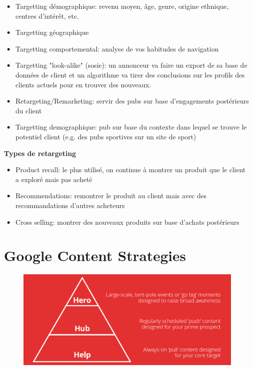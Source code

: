 \begin{itemize}
    \item Targetting démographique: revenu moyen, âge, genre, origine ethnique, centres d'intérêt, etc.
    \item Targetting géographique
    \item Targetting comportemental: analyse de vos habitudes de navigation
    \item Targetting "look-alike" (sosie): un annonceur va faire un export de sa base de données de client et un algorithme va tirer des conclusions sur les profils des clients actuels pour en trouver des nouveaux.
    \item Retargeting/Remarketing: servir des pubs sur base d'engagements postérieurs du client
    \item Targetting demographique: pub sur base du contexte dans lequel se trouve le potentiel client (e.g. des pubs sportives sur un site de sport)\\
\end{itemize}

\textbf{Types de retargeting}

\begin{itemize}
    \item Product recall: le plus utilisé, on continue à montrer un produit que le client a exploré mais pas acheté
    \item Recommendations: remontrer le produit au client mais avec des recommandations d'autres acheteurs
    \item Cross selling: montrer des nouveaux produits sur base d'achats postérieurs
\end{itemize}

\section{Google Content Strategies}

\begin{figure}[H]
\includegraphics[scale=0.40]{../images/lec7img1}
\end{figure}

